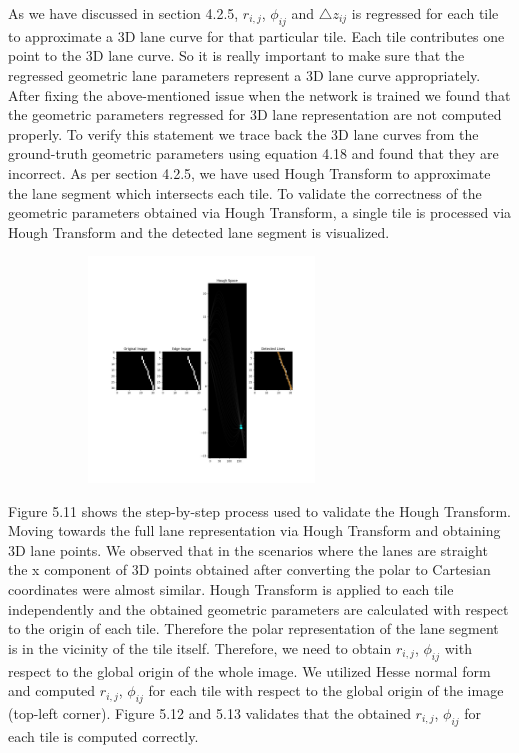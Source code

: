As we have discussed in section 4.2.5, $r_{i,j}$, $\phi_{ij}$ and $\triangle{z}_{ij}$ is regressed for each tile to approximate a 3D lane curve for that particular tile. Each tile contributes one point to the 3D lane curve. So it is really important to make sure that the regressed geometric lane parameters represent a 3D lane curve appropriately. After fixing the above-mentioned issue when the network is trained we found that the geometric parameters regressed for 3D lane representation are not computed properly. To verify this statement we trace back the 3D lane curves from the ground-truth geometric parameters using equation 4.18 and found that they are incorrect. As per section 4.2.5, we have used Hough Transform to approximate the lane segment which intersects each tile. To validate the correctness of the geometric parameters obtained via Hough Transform, a single tile is processed via Hough Transform and the detected lane segment is visualized.

        \begin{figure}[h]
       \caption{Validating Hough Transform and visualizing the detected lane segment from a single tile}
        \centering
        \begin{subfigure}{0.6\textwidth}
        \includegraphics[width=1\linewidth, height=6cm]{images/hough_validation.jpg} 
        \label{fig:subim1}
        \end{subfigure}
        \end{figure}

Figure 5.11 shows the step-by-step process used to validate the Hough Transform. Moving towards the full lane representation via Hough Transform and obtaining 3D lane points. We observed that in the scenarios where the lanes are straight the x component of 3D points obtained after converting the polar to Cartesian coordinates were almost similar. Hough Transform is applied to each tile independently and the obtained geometric parameters are calculated with respect to the origin of each tile. Therefore the polar representation of the lane segment is in the vicinity of the tile itself. Therefore, we need to obtain $r_{i,j}$, $\phi_{ij}$ with respect to the global origin of the whole image. We utilized Hesse normal form and computed $r_{i,j}$, $\phi_{ij}$ for each tile with respect to the global origin of the image (top-left corner). Figure 5.12 and 5.13 validates that the obtained $r_{i,j}$, $\phi_{ij}$ for each tile is computed correctly. 


